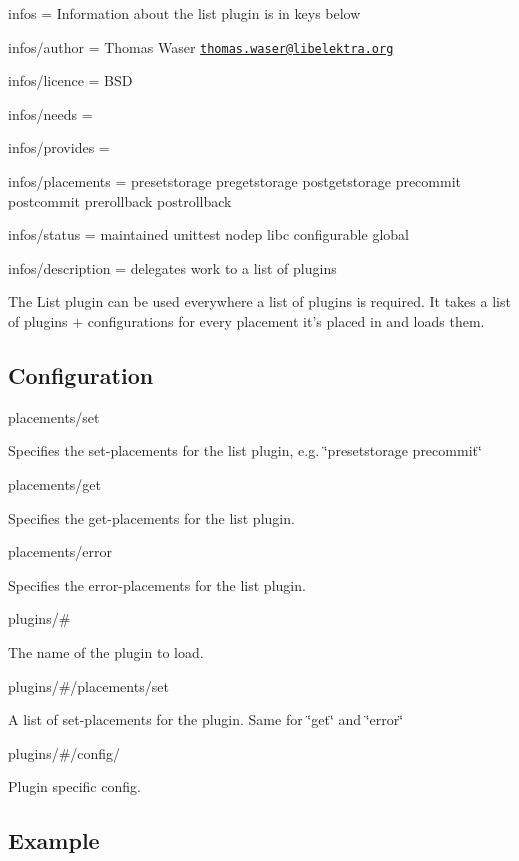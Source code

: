 
\begin{DoxyItemize}
\item infos = Information about the list plugin is in keys below
\item infos/author = Thomas Waser \href{mailto:thomas.waser@libelektra.org}{\tt thomas.\+waser@libelektra.\+org}
\item infos/licence = B\+S\+D
\item infos/needs =
\item infos/provides =
\item infos/placements = presetstorage pregetstorage postgetstorage precommit postcommit prerollback postrollback
\item infos/status = maintained unittest nodep libc configurable global
\item infos/description = delegates work to a list of plugins
\end{DoxyItemize}

The List plugin can be used everywhere a list of plugins is required. It takes a list of plugins + configurations for every placement it's placed in and loads them.

\subsection*{Configuration}

{\ttfamily placements/set}

Specifies the set-\/placements for the list plugin, e.\+g. \char`\"{}presetstorage precommit\char`\"{}

{\ttfamily placements/get}

Specifies the get-\/placements for the list plugin.

{\ttfamily placements/error}

Specifies the error-\/placements for the list plugin.

{\ttfamily plugins/\#}

The name of the plugin to load.

{\ttfamily plugins/\#/placements/set}

A list of set-\/placements for the plugin. Same for \char`\"{}get\char`\"{} and \char`\"{}error\char`\"{}

{\ttfamily plugins/\#/config/}

Plugin specific config.

\subsection*{Example}

